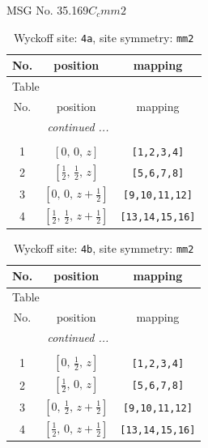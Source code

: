 \documentclass[fleqn,8pt]{jsarticle}
\begin{document}
\setcounter{MaxMatrixCols}{32}

\renewcommand{\tablename}{Table~}
\renewcommand{\figurename}{Figure~}
\begin{center}
\LARGE
MSG No. 35.169\quad$C_{c}mm2$
\end{center}
\renewcommand{\arraystretch}{1.2}
\begin{longtable}{ccc}
\caption{Wyckoff site: {\tt 4a}, site symmetry: {\tt mm2}}
 \\
 \hline \hline
No. & position & mapping \\ \hline \endfirsthead

\multicolumn{2}{l}{\tablename\ \thetable{}} \\
 \hline \hline
No. & position & mapping \\ \hline \endhead

 \hline \hline
\multicolumn{2}{r}{\footnotesize\it continued ...} \\ \endfoot

 \hline \hline
\multicolumn{2}{r}{} \\ \endlastfoot

1 & $\left[ 0,\, 0,\, z \right]$ & {\tt [1,2,3,4]} \\ \hline
2 & $\left[ \frac{1}{2},\, \frac{1}{2},\, z \right]$ & {\tt [5,6,7,8]} \\ \hline
3 & $\left[ 0,\, 0,\, z + \frac{1}{2} \right]$ & {\tt [9,10,11,12]} \\ \hline
4 & $\left[ \frac{1}{2},\, \frac{1}{2},\, z + \frac{1}{2} \right]$ & {\tt [13,14,15,16]} \\
\end{longtable}
\renewcommand{\arraystretch}{1.2}
\begin{longtable}{ccc}
\caption{Wyckoff site: {\tt 4b}, site symmetry: {\tt mm2}}
 \\
 \hline \hline
No. & position & mapping \\ \hline \endfirsthead

\multicolumn{2}{l}{\tablename\ \thetable{}} \\
 \hline \hline
No. & position & mapping \\ \hline \endhead

 \hline \hline
\multicolumn{2}{r}{\footnotesize\it continued ...} \\ \endfoot

 \hline \hline
\multicolumn{2}{r}{} \\ \endlastfoot

1 & $\left[ 0,\, \frac{1}{2},\, z \right]$ & {\tt [1,2,3,4]} \\ \hline
2 & $\left[ \frac{1}{2},\, 0,\, z \right]$ & {\tt [5,6,7,8]} \\ \hline
3 & $\left[ 0,\, \frac{1}{2},\, z + \frac{1}{2} \right]$ & {\tt [9,10,11,12]} \\ \hline
4 & $\left[ \frac{1}{2},\, 0,\, z + \frac{1}{2} \right]$ & {\tt [13,14,15,16]} \\
\end{longtable}
\end{document}
